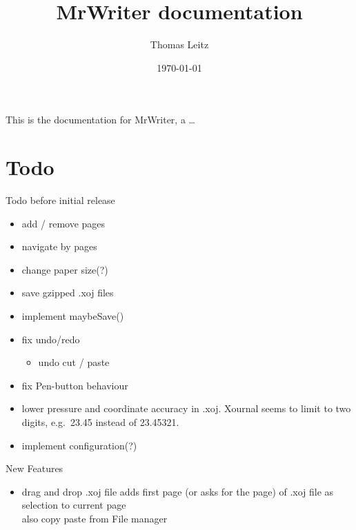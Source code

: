 \documentclass[a4paper]{scrartcl}
\begin{document}
\title{MrWriter documentation}
\author{Thomas Leitz}
\date{\today}
\maketitle

This is the documentation for MrWriter, a \dots

\section{Todo}
Todo before initial release
\begin{itemize}
\item add / remove pages
\item navigate by pages
\item change paper size(?)
\item save gzipped .xoj files
\item implement maybeSave()
\item fix undo/redo
\begin{itemize}
\item undo cut / paste
\end{itemize}
\item fix Pen-button behaviour
\item lower pressure and coordinate accuracy in .xoj. Xournal seems to limit to two digits, e.g.~23.45 instead of 23.45321.
\item implement configuration(?)
\end{itemize}

New Features
\begin{itemize}
\item drag and drop .xoj file adds first page (or asks for the page) of .xoj file as selection to current page\\ also copy paste from File manager
\end{itemize}
\end{document}
